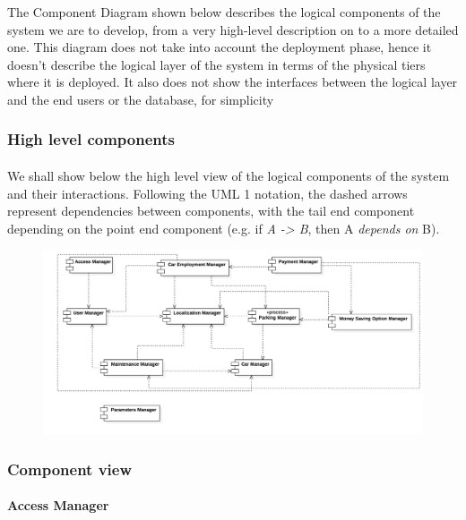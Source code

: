 The Component Diagram shown below describes the logical components of the system we are to develop, from a very high-level description on to a more detailed one. This diagram does not take into account the deployment phase, hence it doesn't describe the logical layer of the system in terms of the physical tiers where it is deployed. It also does not show the interfaces between the logical layer and the end users or the database, for simplicity %

	\subsubsection{High level components}
		\paragraph{} We shall show below the high level view of the logical components of the system and their interactions. Following the UML 1 notation, the dashed arrows represent dependencies between components, with the tail end component depending on the point end component (e.g. if \textit{A -> B}, then A \textit{depends on} B). 

		
		\begin{figure}[h]
			\includegraphics[scale=0.24]{img/component_diagrams/01_high_level_component_view.png}
		\end{figure}

	\subsubsection{Component view}
	
	
	
		\paragraph{Access Manager}
		
